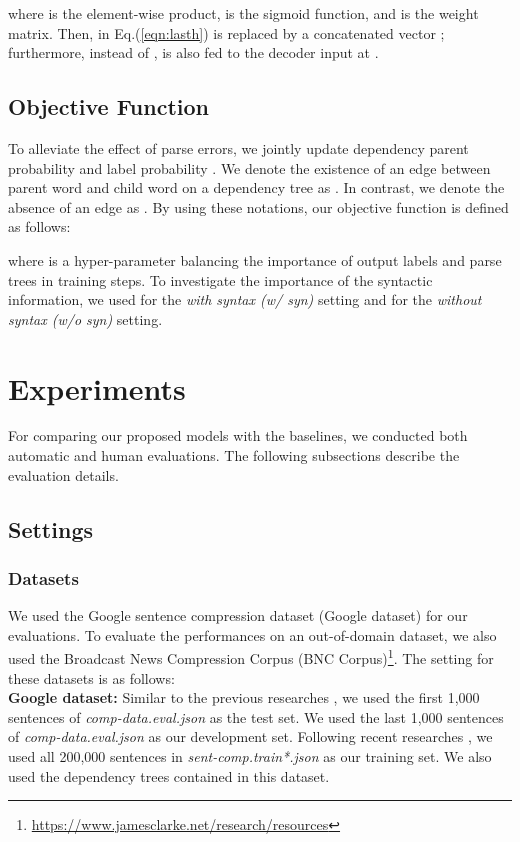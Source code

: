 \documentclass[letterpaper]{article} \usepackage{aaai20}  \usepackage{times}  \usepackage{helvet} \usepackage{courier}  \usepackage[hyphens]{url}  \usepackage{graphicx} \urlstyle{rm} \def\UrlFont{\rm}  \usepackage{graphicx}  \frenchspacing  \setlength{\pdfpagewidth}{8.5in}  \setlength{\pdfpageheight}{11in}  \usepackage{tabu}
\begin{document}
where  is the element-wise product,  is the sigmoid function, and  is the weight matrix.
Then,  in Eq.(\ref{eqn:lasth}) is replaced by a concatenated vector ; furthermore, instead of ,  is also fed to the decoder input at . 

\subsection{Objective Function}
\label{sec:objfunc}
To alleviate the effect of parse errors, we jointly update dependency parent probability  and label probability  \cite{kamigaito-etal-2017-supervised}.
We denote the existence of an edge between parent word  and child word  on a dependency tree as .
In contrast, we denote the absence of an edge as . By using these notations, our objective function is defined as follows:

where  is a hyper-parameter balancing the importance of output labels and parse trees in training steps.
To investigate the importance of the syntactic information, we used  for the \textit{with syntax (w/ syn)} setting and  for the \textit{without syntax (w/o syn)} setting.

\section{Experiments}
For comparing our proposed models with the baselines, we conducted both automatic and human evaluations. The following subsections describe the evaluation details.
\subsection{Settings}
\subsubsection{Datasets}

We used the Google sentence compression dataset (Google dataset) \cite{filippova-altun:2013:EMNLP} for our evaluations. To evaluate the performances on an out-of-domain dataset, we also used the Broadcast News Compression Corpus (BNC Corpus)\footnote{\url{https://www.jamesclarke.net/research/resources}}.
The setting for these datasets is as follows:\\
{\bf Google dataset:} Similar to the previous researches \cite{filippova-EtAl:2015:EMNLP,Tran:2016:EAN:3011077.3011111,wang-EtAl:2017:Long4,kamigaito-etal-2018-higher,zhao-etal-2018-language}, we used the first 1,000 sentences of {\sl comp-data.eval.json} as the test set.
We used the last 1,000 sentences of {\sl comp-data.eval.json} as our development set.
Following recent researches \cite{kamigaito-etal-2018-higher,zhao-etal-2018-language}, we used all 200,000 sentences in {\sl sent-comp.train*.json} as our training set.
We also used the dependency trees contained in this dataset.
\end{document}
